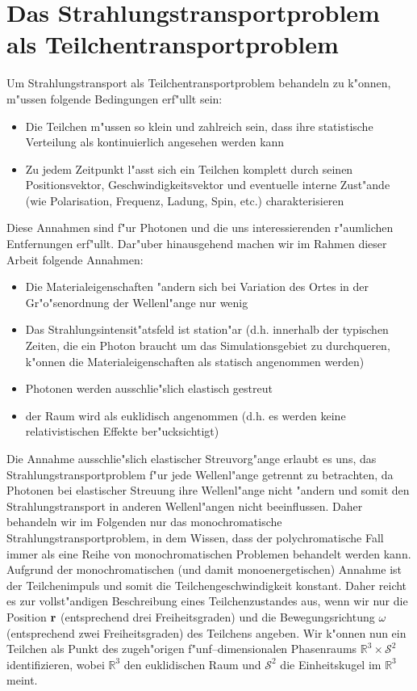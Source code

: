 	\section{Das Strahlungstransportproblem als Teilchentransportproblem}
	Um Strahlungstransport als Teilchentransportproblem behandeln zu k"onnen, m"ussen folgende Bedingungen erf"ullt sein:
	\begin{itemize}
		\item{Die Teilchen m"ussen so klein und zahlreich sein, dass ihre statistische Verteilung als kontinuierlich angesehen werden kann}
		\item{Zu jedem Zeitpunkt l"asst sich ein Teilchen komplett durch seinen Positionsvektor, Geschwindigkeitsvektor und eventuelle interne Zust"ande (wie Polarisation, Frequenz, Ladung, Spin, etc.) charakterisieren}
	\end{itemize}
	Diese Annahmen sind f"ur Photonen und die uns interessierenden r"aumlichen Entfernungen erf"ullt.
	Dar"uber hinausgehend machen wir im Rahmen dieser Arbeit folgende Annahmen:
	\begin{itemize}
		\item{Die Materialeigenschaften "andern sich bei Variation des Ortes in der Gr"o"senordnung der Wellenl"ange nur wenig}
		\item{Das Strahlungsintensit"atsfeld ist station"ar (d.h. innerhalb der typischen Zeiten, die ein Photon braucht um das Simulationsgebiet zu durchqueren, k"onnen die Materialeigenschaften als statisch angenommen werden)}
		\item{Photonen werden ausschlie"slich elastisch gestreut}
		\item{der Raum wird als euklidisch angenommen (d.h. es werden keine relativistischen Effekte ber"ucksichtigt)}
	\end{itemize}
	Die Annahme ausschlie"slich elastischer Streuvorg"ange erlaubt es uns, das Strahlungstransportproblem f"ur jede Wellenl"ange getrennt zu betrachten, da Photonen bei elastischer Streuung ihre Wellenl"ange nicht "andern und somit den Strahlungstransport in anderen Wellenl"angen nicht beeinflussen. Daher behandeln wir im Folgenden nur das monochromatische Strahlungstransportproblem, in dem Wissen, dass der polychromatische Fall immer als eine Reihe von monochromatischen Problemen behandelt werden kann. Aufgrund der monochromatischen (und damit monoenergetischen) Annahme ist der Teilchenimpuls und somit die Teilchengeschwindigkeit konstant. Daher reicht es zur vollst"andigen Beschreibung eines Teilchenzustandes aus, wenn wir nur die Position $\mathbf{r}$ (entsprechend drei Freiheitsgraden) und die Bewegungsrichtung $\omega$ (entsprechend zwei Freiheitsgraden) des Teilchens angeben. Wir k"onnen nun ein Teilchen als Punkt des zugeh"origen f"unf--dimensionalen Phasenraums $\mathbb{R}^3 \times \mathcal{S}^2$ identifizieren, wobei $\mathbb{R}^3$ den euklidischen Raum und $\mathcal{S}^2$ die Einheitskugel im $\mathbb{R}^3$ meint.
	
